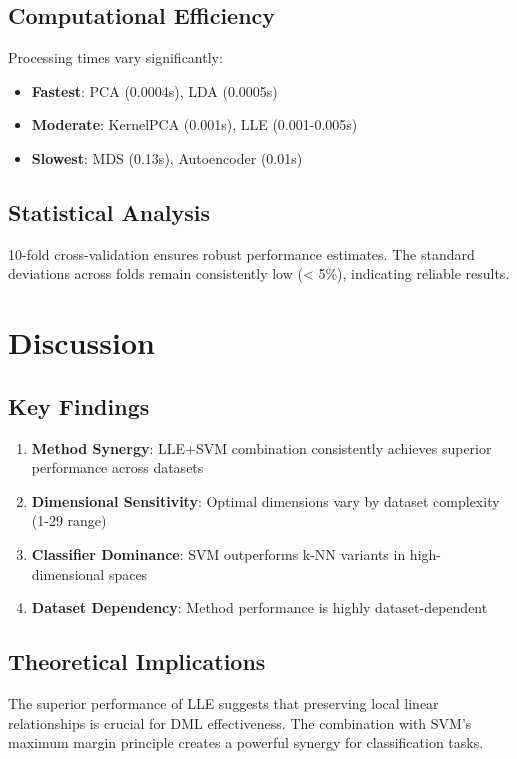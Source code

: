 \documentclass[12pt,a4paper]{article}
\begin{document}
\subsection{Computational Efficiency}

Processing times vary significantly:
\begin{itemize}
    \item \textbf{Fastest}: PCA (0.0004s), LDA (0.0005s)
    \item \textbf{Moderate}: KernelPCA (0.001s), LLE (0.001-0.005s)
    \item \textbf{Slowest}: MDS (0.13s), Autoencoder (0.01s)
\end{itemize}

\subsection{Statistical Analysis}

10-fold cross-validation ensures robust performance estimates. The standard deviations across folds remain consistently low (< 5\%), indicating reliable results.

\section{Discussion}

\subsection{Key Findings}

\begin{enumerate}
    \item \textbf{Method Synergy}: LLE+SVM combination consistently achieves superior performance across datasets
    \item \textbf{Dimensional Sensitivity}: Optimal dimensions vary by dataset complexity (1-29 range)
    \item \textbf{Classifier Dominance}: SVM outperforms k-NN variants in high-dimensional spaces
    \item \textbf{Dataset Dependency}: Method performance is highly dataset-dependent
\end{enumerate}

\subsection{Theoretical Implications}

The superior performance of LLE suggests that preserving local linear relationships is crucial for DML effectiveness. The combination with SVM's maximum margin principle creates a powerful synergy for classification tasks.
\end{document}
